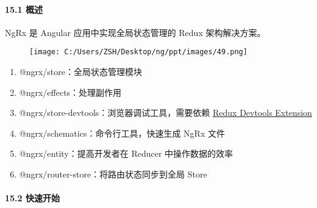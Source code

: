 \documentclass[
]{article}
\begin{document}
\hypertarget{151-ux6982ux8ff0}{%
\paragraph{15.1 概述}\label{151-ux6982ux8ff0}}

NgRx 是 Angular 应用中实现全局状态管理的 Redux 架构解决方案。

\begin{figure}
\centering
\texttt{[image: C:/Users/ZSH/Desktop/ng/ppt/images/49.png]}
\caption{}
\end{figure}

\begin{enumerate}
\def\labelenumi{\arabic{enumi}.}
\item
  @ngrx/store：全局状态管理模块
\item
  @ngrx/effects：处理副作用
\item
  @ngrx/store-devtools：浏览器调试工具，需要依赖
  \href{https://github.com/zalmoxisus/redux-devtools-extension/}{Redux
  Devtools Extension}
\item
  @ngrx/schematics：命令行工具，快速生成 NgRx 文件
\item
  @ngrx/entity：提高开发者在 Reducer 中操作数据的效率
\item
  @ngrx/router-store：将路由状态同步到全局 Store
\end{enumerate}

\hypertarget{152-ux5febux901fux5f00ux59cb}{%
\paragraph{15.2 快速开始}\label{152-ux5febux901fux5f00ux59cb}}
\end{document}
